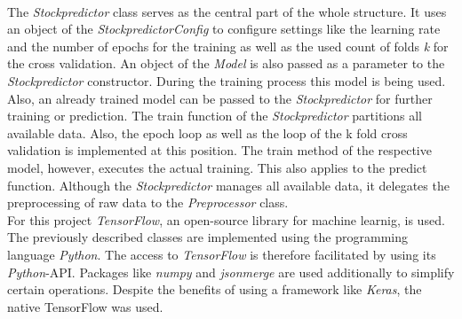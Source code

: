 \\
The \textit{Stockpredictor} class serves as the central part of the whole structure. It uses an object of the \textit{StockpredictorConfig} to configure settings like the learning rate and the number of epochs for the training as well as the used count of folds \textit{k} for the cross validation. An object of the \textit{Model} is also passed as a parameter to the \textit{Stockpredictor} constructor. During the training process this model is being used. Also, an already trained model can be passed to the \textit{Stockpredictor} for further training or prediction. The train function of the \textit{Stockpredictor} partitions all available data. Also, the epoch loop as well as the loop of the k fold cross validation is implemented at this position. The train method of the respective model, however, executes the actual training. This also applies to the predict function. Although the \textit{Stockpredictor} manages all available data, it delegates the preprocessing of raw data to the \textit{Preprocessor} class. 
\\
For this project \textit{TensorFlow}, an open-source library for machine learnig, is used. The previously described classes are implemented using the programming language \textit{Python}. The access to \textit{TensorFlow} is therefore facilitated by using its \textit{Python}-API. Packages like \textit{numpy} and \textit{jsonmerge} are used additionally to simplify certain operations. Despite the benefits of using a framework like \textit{Keras}, the native TensorFlow was used. 